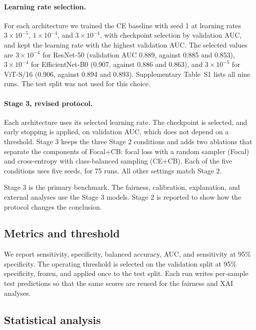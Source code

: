 \documentclass[11pt]{article}
\begin{document}
\paragraph{Learning rate selection.} For each architecture we trained the CE baseline with seed 1 at learning rates $3\times10^{-5}$, $1\times10^{-4}$, and $3\times10^{-4}$, with checkpoint selection by validation AUC, and kept the learning rate with the highest validation AUC. The selected values are $3\times10^{-4}$ for ResNet-50 (validation AUC 0.889, against 0.885 and 0.853), $3\times10^{-4}$ for EfficientNet-B0 (0.907, against 0.886 and 0.863), and $3\times10^{-5}$ for ViT-S/16 (0.906, against 0.894 and 0.893). Supplementary Table~S1 lists all nine runs. The test split was not used for this choice.

\paragraph{Stage 3, revised protocol.} Each architecture uses its selected learning rate. The checkpoint is selected, and early stopping is applied, on validation AUC, which does not depend on a threshold. Stage 3 keeps the three Stage 2 conditions and adds two ablations that separate the components of Focal+CB: focal loss with a random sampler (Focal) and cross-entropy with class-balanced sampling (CE+CB). Each of the five conditions uses five seeds, for 75 runs. All other settings match Stage 2.

Stage 3 is the primary benchmark. The fairness, calibration, explanation, and external analyses use the Stage 3 models. Stage 2 is reported to show how the protocol changes the conclusion.

\subsection{Metrics and threshold}

We report sensitivity, specificity, balanced accuracy, AUC, and sensitivity at 95\% specificity. The operating threshold is selected on the validation split at 95\% specificity, frozen, and applied once to the test split. Each run writes per-sample test predictions so that the same scores are reused for the fairness and XAI analyses.

\subsection{Statistical analysis}
\end{document}

